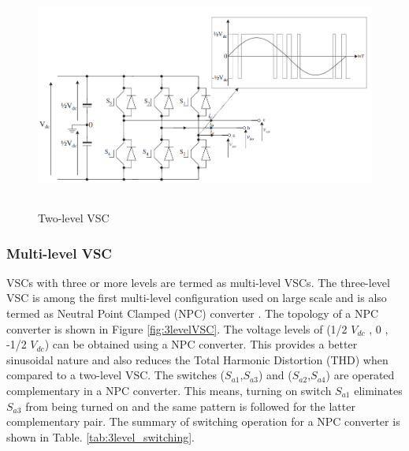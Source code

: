 \begin{figure}[H]
\centering
    \includegraphics[height = 7.5cm,width = 15.5cm]{Diagrams/Chapter_2/2levelVSC.PNG}
    \caption{Two-level VSC \cite{noauthor_appendix_2014}}
    \label{fig:2levelVSC}
\end{figure}

\subsubsection{Multi-level VSC}
\gls{VSC}s with three or more levels are termed as multi-level \gls{VSC}s. The three-level \gls{VSC} is among the first multi-level configuration used on large scale and is also termed as Neutral Point Clamped (\gls{NPC}) converter \cite{sharifabadi2016design}. The topology of a \gls{NPC} converter is shown in Figure \ref{fig:3levelVSC}. The voltage levels of (1/2 $V_{dc}$ , 0 , -1/2 $V_{dc}$) can be obtained using a \gls{NPC} converter. This provides a better sinusoidal nature and also reduces the Total Harmonic Distortion (THD) when compared to a two-level \gls{VSC}. The switches ($S_{a1}$,$S_{a3}$) and ($S_{a2}$,$S_{a4}$) are operated complementary in a \gls{NPC} converter. This means, turning on switch $S_{a1}$ eliminates $S_{a3}$ from being turned on and the same pattern is followed for the latter complementary pair. The summary of switching operation for a \gls{NPC} converter is shown in Table. \ref{tab:3level_switching}. 

